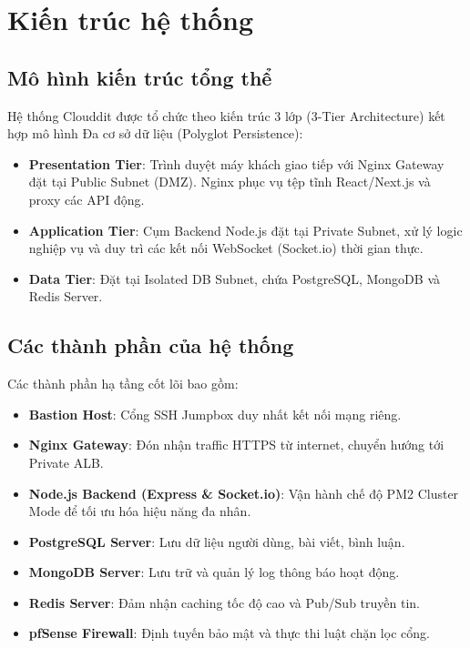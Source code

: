 \documentclass[12pt, a4paper]{article}
\begin{document}

\section{Kiến trúc hệ thống}

\subsection{Mô hình kiến trúc tổng thể}
Hệ thống Clouddit được tổ chức theo kiến trúc 3 lớp (3-Tier Architecture) kết hợp mô hình Đa cơ sở dữ liệu (Polyglot Persistence):
\begin{itemize}
    \item \textbf{Presentation Tier}: Trình duyệt máy khách giao tiếp với Nginx Gateway đặt tại Public Subnet (DMZ). Nginx phục vụ tệp tĩnh React/Next.js và proxy các API động.
    \item \textbf{Application Tier}: Cụm Backend Node.js đặt tại Private Subnet, xử lý logic nghiệp vụ và duy trì các kết nối WebSocket (Socket.io) thời gian thực.
    \item \textbf{Data Tier}: Đặt tại Isolated DB Subnet, chứa PostgreSQL, MongoDB và Redis Server.
\end{itemize}

\subsection{Các thành phần của hệ thống}
Các thành phần hạ tầng cốt lõi bao gồm:
\begin{itemize}
    \item \textbf{Bastion Host}: Cổng SSH Jumpbox duy nhất kết nối mạng riêng.
    \item \textbf{Nginx Gateway}: Đón nhận traffic HTTPS từ internet, chuyển hướng tới Private ALB.
    \item \textbf{Node.js Backend (Express & Socket.io)}: Vận hành chế độ PM2 Cluster Mode để tối ưu hóa hiệu năng đa nhân.
    \item \textbf{PostgreSQL Server}: Lưu dữ liệu người dùng, bài viết, bình luận.
    \item \textbf{MongoDB Server}: Lưu trữ và quản lý log thông báo hoạt động.
    \item \textbf{Redis Server}: Đảm nhận caching tốc độ cao và Pub/Sub truyền tin.
    \item \textbf{pfSense Firewall}: Định tuyến bảo mật và thực thi luật chặn lọc cổng.
\end{itemize}
\end{document}
